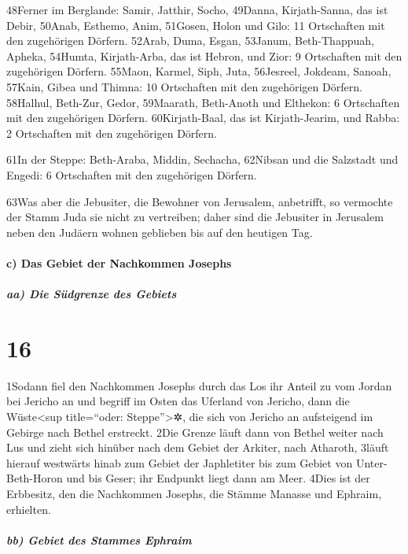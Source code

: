 48Ferner im Berglande: Samir, Jatthir, Socho, 49Danna, Kirjath-Sanna,
das ist Debir, 50Anab, Esthemo, Anim, 51Gosen, Holon und Gilo: 11
Ortschaften mit den zugehörigen Dörfern. 52Arab, Duma, Esgan, 53Janum,
Beth-Thappuah, Apheka, 54Humta, Kirjath-Arba, das ist Hebron, und Zior:
9 Ortschaften mit den zugehörigen Dörfern. 55Maon, Karmel, Siph, Juta,
56Jesreel, Jokdeam, Sanoah, 57Kain, Gibea und Thimna: 10 Ortschaften mit
den zugehörigen Dörfern. 58Halhul, Beth-Zur, Gedor, 59Maarath,
Beth-Anoth und Elthekon: 6 Ortschaften mit den zugehörigen Dörfern.
60Kirjath-Baal, das ist Kirjath-Jearim, und Rabba: 2 Ortschaften mit den
zugehörigen Dörfern.

61In der Steppe: Beth-Araba, Middin, Sechacha, 62Nibsan und die
Salzstadt und Engedi: 6 Ortschaften mit den zugehörigen Dörfern.

63Was aber die Jebusiter, die Bewohner von Jerusalem, anbetrifft, so
vermochte der Stamm Juda sie nicht zu vertreiben; daher sind die
Jebusiter in Jerusalem neben den Judäern wohnen geblieben bis auf den
heutigen Tag.

\hypertarget{c-das-gebiet-der-nachkommen-josephs}{%
\paragraph{c) Das Gebiet der Nachkommen
Josephs}\label{c-das-gebiet-der-nachkommen-josephs}}

\hypertarget{aa-die-suxfcdgrenze-des-gebiets}{%
\subparagraph{aa) Die Südgrenze des
Gebiets}\label{aa-die-suxfcdgrenze-des-gebiets}}

\hypertarget{section-15}{%
\section{16}\label{section-15}}

1Sodann fiel den Nachkommen Josephs durch das Los ihr Anteil zu vom
Jordan bei Jericho an und begriff im Osten das Uferland von Jericho,
dann die Wüste\textless sup title=``oder: Steppe''\textgreater✲, die
sich von Jericho an aufsteigend im Gebirge nach Bethel erstreckt. 2Die
Grenze läuft dann von Bethel weiter nach Lus und zieht sich hinüber nach
dem Gebiet der Arkiter, nach Atharoth, 3läuft hierauf westwärts hinab
zum Gebiet der Japhletiter bis zum Gebiet von Unter-Beth-Horon und bis
Geser; ihr Endpunkt liegt dann am Meer. 4Dies ist der Erbbesitz, den die
Nachkommen Josephs, die Stämme Manasse und Ephraim, erhielten.

\hypertarget{bb-gebiet-des-stammes-ephraim}{%
\subparagraph{bb) Gebiet des Stammes
Ephraim}\label{bb-gebiet-des-stammes-ephraim}}

